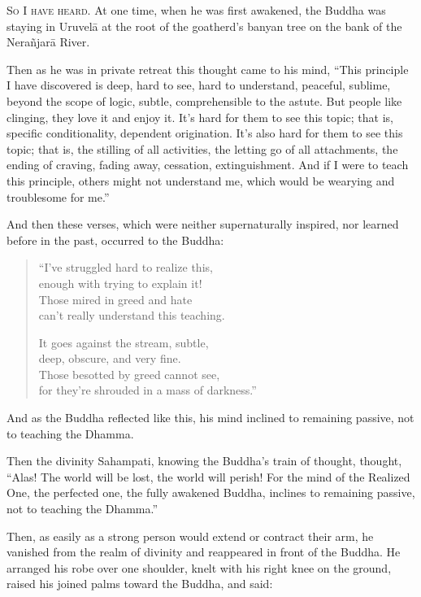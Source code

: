 \documentclass[12pt,openany]{book}%
\newcommand*{\scevam}[1]{\textsc{#1}}
\begin{document}
\scevam{So I have heard. }At one time, when he was first awakened, the Buddha was staying in \textsanskrit{Uruvelā} at the root of the goatherd’s banyan tree on the bank of the \textsanskrit{Nerañjarā} River. 

Then as he was in private retreat this thought came to his mind, “This principle I have discovered is deep, hard to see, hard to understand, peaceful, sublime, beyond the scope of logic, subtle, comprehensible to the astute. But people like clinging, they love it and enjoy it. It’s hard for them to see this topic; that is, specific conditionality, dependent origination. It’s also hard for them to see this topic; that is, the stilling of all activities, the letting go of all attachments, the ending of craving, fading away, cessation, extinguishment. And if I were to teach this principle, others might not understand me, which would be wearying and troublesome for me.” 

And then these verses, which were neither supernaturally inspired, nor learned before in the past, occurred to the Buddha: 

\begin{verse}%
“I’ve struggled hard to realize this, \\
enough with trying to explain it! \\
Those mired in greed and hate \\
can’t really understand this teaching. 

It goes against the stream, subtle, \\
deep, obscure, and very fine. \\
Those besotted by greed cannot see, \\
for they’re shrouded in a mass of darkness.” 

%
\end{verse}

And as the Buddha reflected like this, his mind inclined to remaining passive, not to teaching the Dhamma. 

Then the divinity Sahampati, knowing the Buddha’s train of thought, thought, “Alas! The world will be lost, the world will perish! For the mind of the Realized One, the perfected one, the fully awakened Buddha, inclines to remaining passive, not to teaching the Dhamma.” 

Then, as easily as a strong person would extend or contract their arm, he vanished from the realm of divinity and reappeared in front of the Buddha. He arranged his robe over one shoulder, knelt with his right knee on the ground, raised his joined palms toward the Buddha, and said: 
\end{document}
